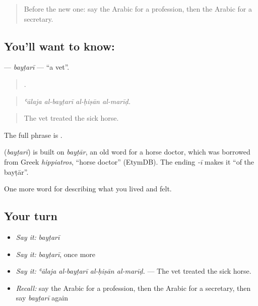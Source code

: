 \label{lesson:AR-C518-baytari}



\begin{quote}
Before the new one: say the Arabic for a profession, then the Arabic for a secretary.
\end{quote}

\subsection*{You'll want to know: }
\textbf{} — \emph{bayṭarī} — \textquotedblleft{}a vet\textquotedblright{}.

\begin{quote}
   .
\end{quote}

\begin{quote}
\emph{ʿālaja al-bayṭarī al-ḥiṣān al-marīḍ.}
\end{quote}

\begin{quote}
The vet treated the sick horse.
\end{quote}

The full phrase is  .

\begin{cousinweb}
\textbf{} (\emph{bayṭarī}) is built on \emph{bayṭār}, an old word for a horse doctor, which was borrowed from Greek \emph{hippiatros}, \textquotedblleft{}horse doctor\textquotedblright{} (EtymDB). The ending \emph{-ī} makes it \textquotedblleft{}of the bayṭār\textquotedblright{}.
\end{cousinweb}

\begin{grammarlens}[title={What you've built}]
One more word for describing what you lived and felt.
\end{grammarlens}

\subsection*{Your turn}
\begin{itemize}
\raggedright
  \item \emph{Say it:} \emph{bayṭarī}
  \item \emph{Say it:} \emph{bayṭarī}, once more
  \item \emph{Say it:} \emph{ʿālaja al-bayṭarī al-ḥiṣān al-marīḍ.} — The vet treated the sick horse.
  \item \emph{Recall:} say the Arabic for a profession, then the Arabic for a secretary, then say \emph{bayṭarī} again
\end{itemize}

